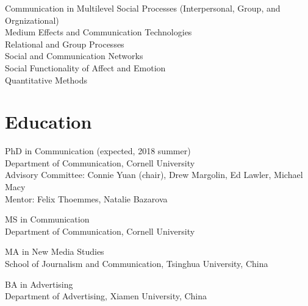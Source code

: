 \documentclass[11pt, letterpaper]{article} %
\newcommand{\years}[1]{\leavevmode\marginnote{\scriptsize #1}} %
\begin{document}
Communication in Multilevel Social Processes (Interpersonal, Group, and Orgnizational)\\
Medium Effects and Communication Technologies\\
Relational and Group Processes\\  
Social and Communication Networks\\ 
Social Functionality of Affect and Emotion\\ 
Quantitative Methods %




\section*{Education}

PhD in Communication (expected, 2018 summer) \\
    \textsf{
        Department of Communication, Cornell University\\
        Advisory Committee: Connie Yuan (chair), Drew Margolin, Ed Lawler, Michael Macy\\
        Mentor: Felix Thoemmes, Natalie Bazarova
            } 

MS in Communication \years{2015} \\
    \textsf{Department of Communication, Cornell University}

MA in New Media Studies \years{2012} \\
    \textsf{School of Journalism and Communication, Tsinghua University, China}

BA in Advertising \years{2009} \\
    \textsf{Department of Advertising, Xiamen University, China}


\end{document}
